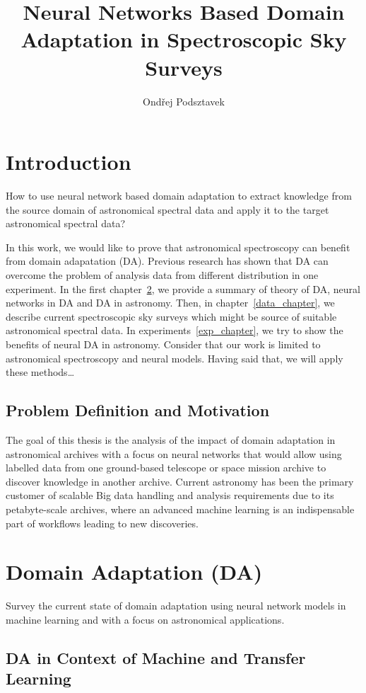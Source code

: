 \documentclass[thesis=M,english]{FITthesis}[2012/10/20]
\title{Neural Networks Based Domain Adaptation in Spectroscopic Sky Surveys}
\author{Ondřej Podsztavek}
\begin{document}
\chapter{Introduction}

How to use neural network based domain adaptation to extract knowledge from the source domain of astronomical spectral data
and apply it to the target astronomical spectral data?

In this work, we would like to prove that astronomical spectroscopy can benefit from domain adapatation (DA).
Previous research has shown that DA can overcome the problem of analysis data from different distribution in one experiment.
In the first chapter~\ref{da_chapter}, we provide a summary of theory of DA, neural networks in DA and DA in astronomy.
Then, in chapter~\ref{data_chapter}, we describe current spectroscopic sky surveys
which might be source of suitable astronomical spectral data.
In experiments~\ref{exp_chapter}, we try to show the benefits of neural DA in astronomy.
Consider that our work is limited to astronomical spectroscopy and neural models.
Having said that, we will apply these methods\dots{}

\section{Problem Definition and Motivation}

The goal of this thesis is the analysis of the impact of domain adaptation in astronomical archives with a focus on neural networks
that would allow using labelled data from one ground-based telescope or space mission archive to discover knowledge in another archive.
Current astronomy has been the primary customer of scalable Big data handling and analysis requirements due to its petabyte-scale archives,
where an advanced machine learning is an indispensable part of workflows leading to new discoveries.

\chapter{Domain Adaptation (DA)}
\label{da_chapter}

Survey the current state of domain adaptation using neural network models in machine learning and with a focus on astronomical applications.

\section{DA in Context of Machine and Transfer Learning}
\end{document}
